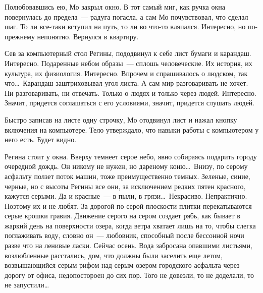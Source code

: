 Полюбовавшись ею, Мо закрыл окно. В тот самый миг, как ручка окна повернулась 
до 
предела~--- радуга погасла, а сам Мо почувствовал, что сделал шаг. То ли 
все-таки вступил на путь, то ли во что-то вляпался. Интересно, но по-прежнему 
непонятно. Вернулся в квартиру.

Сев за компьютерный стол Регины, пододвинул к себе лист бумаги и карандаш. 
Интересно. Подаренные небом образы~--- сплошь человеческие. Их история, их 
культура, их физиология. Интересно. Впрочем и спрашивалось о людском, так 
что\ldots\ 
Карандаш заштриховывал угол листа. А сам мир разговаривать не хочет. Ни 
разговаривать, ни отвечать. Только о людях и только через людей. Интересно. 
Значит, придется соглашаться с его условиями, значит, придется слушать людей.

Быстро записав на листе одну строчку, Мо отодвинул лист и нажал кнопку 
включения 
на компьютере. Тело утверждало, что навыки работы с компьютером у него есть. 
Будет видно.

Регина стоит у окна. Вверху темнеет серое небо, явно собираясь подарить городу 
очередной дождь. Он никому не нужен, но дареному коню\ldots\ Внизу, по серому 
асфальту ползет поток машин, тоже преимущественно темных. Зеленые, синие, 
черные, но с высоты Регины все они, за исключением редких пятен красного, 
кажутся серыми. Да и красные~--- в пыли, в грязи\ldots\ Некрасиво. Непрактично. 
Поэтому их и не любят. За дорогой по серой плоскости плитки перекатываются 
серые 
крошки гравия. Движение серого на сером создает рябь, как бывает в жаркий день 
на поверхности озера, когда ветра хватает лишь на то, чтобы слегка поглаживать 
воду, словно он~--- любовник, способный после бессонной ночи разве что на 
ленивые ласки. Сейчас осень. Вода забросана опавшими листьями, возлюбленные 
расстались, дом, что должны были заселить еще летом, возвышающийся серым рифом 
над серым озером городского асфальта через дорогу от офиса, недопостороен до 
сих пор. Того не довезли, то не доделали, то не запустили\ldots

